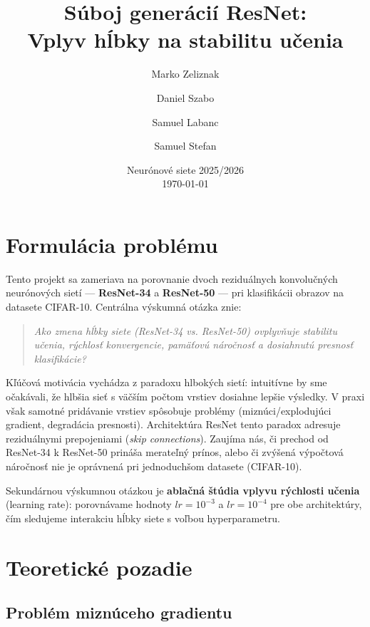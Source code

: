 \documentclass[12pt,a4paper]{article}
\title{
  \textbf{Súboj generácií ResNet:} \\
  \large Vplyv hĺbky na stabilitu učenia
}
\author{Marko Zeliznak \and Daniel Szabo \and Samuel Labanc \and Samuel Stefan}
\date{Neurónové siete 2025/2026 \\ \today}
\begin{document}
\maketitle
\tableofcontents
\newpage

\section{Formulácia problému}

Tento projekt sa zameriava na porovnanie dvoch reziduálnych konvolučných neurónových sietí
— \textbf{ResNet-34} a \textbf{ResNet-50} — pri klasifikácii obrazov na datasete CIFAR-10.
Centrálna výskumná otázka znie:

\begin{quote}
\textit{Ako zmena hĺbky siete (ResNet-34 vs. ResNet-50) ovplyvňuje stabilitu učenia,
rýchlosť konvergencie, pamäťovú náročnosť a dosiahnutú presnosť klasifikácie?}
\end{quote}

Kľúčová motivácia vychádza z paradoxu hlbokých sietí: intuitívne by sme očakávali,
že hlbšia sieť s väčším počtom vrstiev dosiahne lepšie výsledky. V praxi však samotné
pridávanie vrstiev spôsobuje problémy (miznúci/explodujúci gradient, degradácia presnosti).
Architektúra ResNet tento paradox adresuje reziduálnymi prepojeniami (\textit{skip connections}).
Zaujíma nás, či prechod od ResNet-34 k ResNet-50 prináša merateľný prínos, alebo či zvýšená
výpočtová náročnosť nie je oprávnená pri jednoduchšom datasete (CIFAR-10).

Sekundárnou výskumnou otázkou je \textbf{ablačná štúdia vplyvu rýchlosti učenia} (learning rate):
porovnávame hodnoty $lr = 10^{-3}$ a $lr = 10^{-4}$ pre obe architektúry, čím sledujeme
interakciu hĺbky siete s voľbou hyperparametru.

\section{Teoretické pozadie}

\subsection{Problém miznúceho gradientu}
\end{document}

